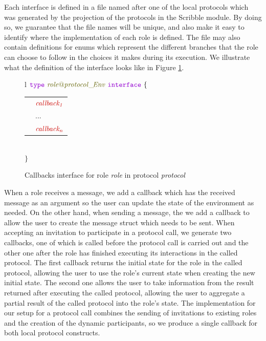 \documentclass[12pt,twoside]{report}
\begin{document}
Each interface is defined in a file named after one of the local protocols which was generated by the projection of the protocols in the Scribble module. By doing so, we guarantee that the file names will be unique, and also make it easy to identify where the implementation of each role is defined. The file may also contain definitions for enums which represent the different branches that the role can choose to follow in the choices it makes during its execution. We illustrate what the definition of the interface looks like in Figure \ref{callbacks-interface-gen}.\\

\begin{figure}[!h]
    \begin{center}
        \begin{tabular}{l}
            $\gotype\ \interfacename{\localprotocol{role}{protocol}\_\!Env}\ \gointerface\ \{$ \\[3pt]
            \begin{tabular}{ll}
                \indent & $\functionname{callback_1}$\\[3.5pt]
                \indent & ...\\[3.5pt]
                \indent & $\functionname{callback_n}$\\[3.5pt]
            \end{tabular}\\[3pt]
            $\}$
        \end{tabular}

    \end{center}
    \caption{Callbacks interface for role \textit{role} in protocol \textit{protocol}}
    \label{callbacks-interface-gen}
\end{figure}

When a role receives a message, we add a callback which has the received message as an argument so the user can update the state of the environment as needed. On the other hand, when sending a message, the we add a callback to allow the user to create the message struct which needs to be sent. When accepting an invitation to participate in a protocol call, we generate two callbacks, one of which is called before the protocol call is carried out and the other one after the role has finished executing its interactions in the called protocol. The first callback returns the initial state for the role in the called protocol, allowing the user to use the role's current state when creating the new initial state. The second one allows the user to take information from the result returned after executing the called protocol, allowing the user to aggregate a partial result of the called protocol into the role's state. The implementation for our setup for a protocol call combines the sending of invitations to existing roles and the creation of the dynamic participants, so we produce a single callback for both local protocol constructs.\\
\end{document}
